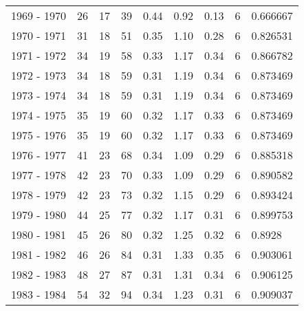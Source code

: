 \begin{tabular}{lrrrrrrrl}
1969 - 1970 &                      26 &          17 &       39 &        0.44 &        0.92 &        0.13 &           6 &   0.666667 \\
1970 - 1971 &                      31 &          18 &       51 &        0.35 &        1.10 &        0.28 &           6 &   0.826531 \\
1971 - 1972 &                      34 &          19 &       58 &        0.33 &        1.17 &        0.34 &           6 &   0.866782 \\
1972 - 1973 &                      34 &          18 &       59 &        0.31 &        1.19 &        0.34 &           6 &   0.873469 \\
1973 - 1974 &                      34 &          18 &       59 &        0.31 &        1.19 &        0.34 &           6 &   0.873469 \\
1974 - 1975 &                      35 &          19 &       60 &        0.32 &        1.17 &        0.33 &           6 &   0.873469 \\
1975 - 1976 &                      35 &          19 &       60 &        0.32 &        1.17 &        0.33 &           6 &   0.873469 \\
1976 - 1977 &                      41 &          23 &       68 &        0.34 &        1.09 &        0.29 &           6 &   0.885318 \\
1977 - 1978 &                      42 &          23 &       70 &        0.33 &        1.09 &        0.29 &           6 &   0.890582 \\
1978 - 1979 &                      42 &          23 &       73 &        0.32 &        1.15 &        0.29 &           6 &   0.893424 \\
1979 - 1980 &                      44 &          25 &       77 &        0.32 &        1.17 &        0.31 &           6 &   0.899753 \\
1980 - 1981 &                      45 &          26 &       80 &        0.32 &        1.25 &        0.32 &           6 &     0.8928 \\
1981 - 1982 &                      46 &          26 &       84 &        0.31 &        1.33 &        0.35 &           6 &   0.903061 \\
1982 - 1983 &                      48 &          27 &       87 &        0.31 &        1.31 &        0.34 &           6 &   0.906125 \\
1983 - 1984 &                      54 &          32 &       94 &        0.34 &        1.23 &        0.31 &           6 &   0.909037 \\

\end{tabular}
